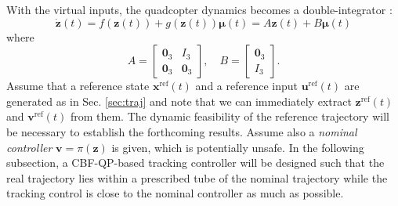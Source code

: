 \documentclass[journal,10pt]{IEEEtran}
\newcommand{\vect}[1]{\boldsymbol{\mathbf{#1}}}
\newcommand{\mat}[1]{\begin{bmatrix} #1 \end{bmatrix}}
\newif\ifdraft
\newcommand{\XX}[1]{\ifdraft{\color{red}[{\bf XX}: #1]}\fi}
\newcommand{\VF}[1]{\ifdraft{\color{blue}[{\bf VF}: #1]}\fi}
\begin{document}
With the virtual inputs, the quadcopter dynamics becomes a double-integrator \cite{FMPC,cbf_pos}: 
\begin{equation} \label{lin_sys}
    \dot{\vect{z}}(t) = f(\vect{z}(t)) + g(\vect{z}(t)) \vect{\mu}(t) =  A\vect{z}(t) + B\vect{\mu}(t)
\end{equation}
where 
\begin{equation*}
    A = \mat{\vect{0}_3 & I_3\\ \vect{0}_3 & \vect{0}_3}, \quad B=\mat{\vect{0}_3\\ I_3}.
\end{equation*}
Assume that a reference state $\vect{x}^{\text{ref}}(t)$ and a reference input $\vect{u}^{\text{ref}}(t)$ are generated as in Sec. \ref{sec:traj} and note that we can immediately extract $\vect{z}^{\text{ref}}(t)$ and $\vect{v}^{\text{ref}}(t)$ from them. The dynamic feasibility of the reference trajectory will be necessary to establish the forthcoming results. Assume also a \emph{nominal controller} $\vect{v} = \pi(\vect{z})$ is given, which is potentially unsafe. In the following subsection, a CBF-QP-based tracking controller will be designed such that the real trajectory lies within a prescribed tube of the nominal trajectory while the tracking control is close to the nominal controller as much as possible.  
\end{document}
